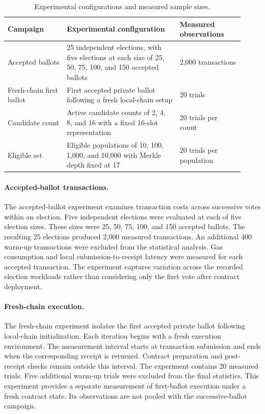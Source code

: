 \begin{table}[t]
\centering
\caption{Experimental configurations and measured sample sizes.}
\label{tab:implementation-campaigns}
\small
\begin{tabular}{@{}p{0.23\linewidth}p{0.44\linewidth}p{0.25\linewidth}@{}}
\toprule
\textbf{Campaign} &
\textbf{Experimental configuration} &
\textbf{Measured observations} \\
\midrule
Accepted ballots
& 25 independent elections, with five elections at each
size of 25, 50, 75, 100, and 150 accepted ballots
& 2,000 transactions \\
\addlinespace
Fresh-chain first ballot
& First accepted private ballot following a fresh
local-chain setup
& 20 trials \\
\addlinespace
Candidate count
& Active candidate counts of 2, 4, 8, and 16
with a fixed 16-slot representation
& 20 trials per count \\
\addlinespace
Eligible set
& Eligible populations of 10, 100, 1,000, and
10,000 with Merkle depth fixed at 17
& 20 trials per population \\
\bottomrule
\end{tabular}
\end{table}

\paragraph{Accepted-ballot transactions.}

The accepted-ballot experiment examines transaction
costs across successive votes within an election.
Five independent elections were evaluated at each
of five election sizes. These sizes were 25, 50,
75, 100, and 150 accepted ballots. The resulting
25 elections produced 2,000 measured transactions.
An additional 400 warm-up transactions were excluded
from the statistical analysis. Gas consumption and
local submission-to-receipt latency were measured
for each accepted transaction. The experiment
captures variation across the recorded election
workloads rather than considering only the first
vote after contract deployment.

\paragraph{Fresh-chain execution.}

The fresh-chain experiment isolates the first
accepted private ballot following local-chain
initialization. Each iteration begins with a
fresh execution environment. The measurement
interval starts at transaction submission and
ends when the corresponding receipt is returned.
Contract preparation and post-receipt checks
remain outside this interval. The experiment
contains 20 measured trials. Five additional
warm-up trials were excluded from the final
statistics.
This experiment provides a separate measurement
of first-ballot execution under a fresh contract
state. Its observations are not pooled with
the successive-ballot campaign.

